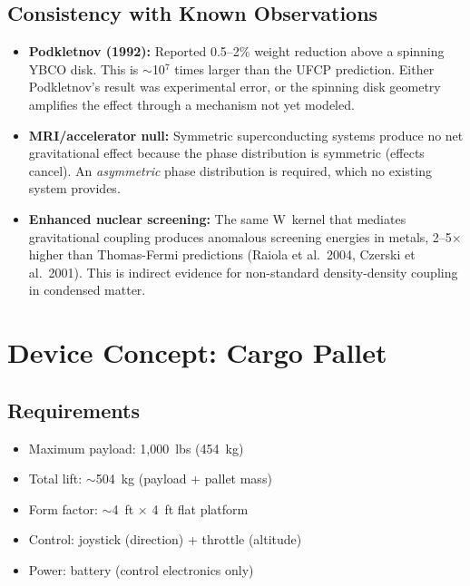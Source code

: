 \documentclass[11pt, a4paper]{article}
\begin{document}
\subsection{Consistency with Known Observations}

\begin{itemize}[nosep]
  \item \textbf{Podkletnov (1992):} Reported 0.5--2\% weight
        reduction above a spinning YBCO disk. This is
        $\sim$10$^7$ times larger than the UFCP prediction.
        Either Podkletnov's result was experimental error, or
        the spinning disk geometry amplifies the effect through
        a mechanism not yet modeled.
  \item \textbf{MRI/accelerator null:} Symmetric superconducting
        systems produce no net gravitational effect because the
        phase distribution is symmetric (effects cancel). An
        \emph{asymmetric} phase distribution is required, which
        no existing system provides.
  \item \textbf{Enhanced nuclear screening:} The same W~kernel
        that mediates gravitational coupling produces anomalous
        screening energies in metals, 2--5$\times$ higher than
        Thomas-Fermi predictions (Raiola et al.~2004, Czerski
        et al.~2001). This is indirect evidence for non-standard
        density-density coupling in condensed matter.
\end{itemize}

\section{Device Concept: Cargo Pallet}

\subsection{Requirements}

\begin{itemize}[nosep]
  \item Maximum payload: 1{,}000~lbs (454~kg)
  \item Total lift: $\sim$504~kg (payload + pallet mass)
  \item Form factor: $\sim$4~ft $\times$ 4~ft flat platform
  \item Control: joystick (direction) + throttle (altitude)
  \item Power: battery (control electronics only)
\end{itemize}
\end{document}
